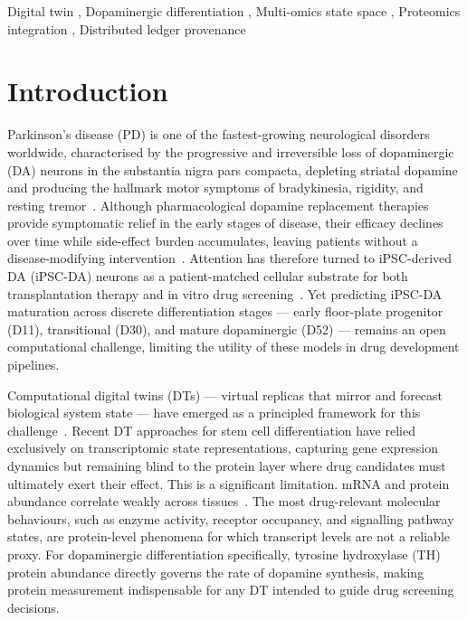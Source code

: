 \documentclass[5p,times,twocolumn]{elsarticle}
\newcommand{\rtag}[1]{}
\newcommand{\rev}[2]{\rtag{#1}#2}
\newcommand{\lang}[1]{#1}
\begin{document}
\begin{frontmatter}
  \begin{keyword}
    Digital twin \sep
    Dopaminergic differentiation \sep
    Multi-omics state space \sep
    Proteomics integration \sep
    Distributed ledger provenance
  \end{keyword}

\end{frontmatter}

\section{Introduction}

Parkinson's disease (PD) is one of the fastest-growing
neurological disorders worldwide, characterised by the
progressive and irreversible loss of dopaminergic (DA)
neurons in the substantia nigra pars compacta,
depleting striatal dopamine and producing the hallmark
motor symptoms of bradykinesia, rigidity, and resting
tremor~\cite{jang2020current}.
Although pharmacological dopamine replacement therapies
provide symptomatic relief in the early stages of
disease, their efficacy declines over time while
side-effect burden accumulates, leaving patients without
a disease-modifying intervention~\cite{barker2024history}.
\lang{Attention has therefore turned to}
iPSC-derived DA (iPSC-DA) neurons as a patient-matched
cellular substrate for both transplantation therapy
and in vitro drug screening~\cite{oz2023neural}.
Yet \lang{predicting} iPSC-DA maturation
across discrete differentiation stages\rev{AC}{ ---
  early floor-plate progenitor (D11), transitional (D30),
  and mature dopaminergic (D52) ---} remains an open computational challenge,
limiting the utility of these models in drug
development pipelines.

Computational digital twins (DTs) --- virtual replicas
that mirror and forecast biological system state ---
have emerged as a principled framework for this
challenge~\cite{masison2021modular}.
Recent DT approaches for stem cell differentiation
have relied exclusively on \lang{transcriptomic state
  representations}, capturing gene expression dynamics
but remaining blind to the protein layer where \lang{drug
  candidates} must ultimately exert their effect.
This is a significant limitation. mRNA and protein abundance correlate weakly across tissues~\cite{kosti2016cross}. The most drug-relevant molecular behaviours, such as enzyme activity, receptor occupancy, and signalling pathway states, are protein-level phenomena \lang{for which transcript levels are not a reliable proxy}.
For dopaminergic differentiation specifically,
tyrosine hydroxylase (TH) protein abundance directly
governs the rate of dopamine synthesis, making protein
measurement indispensable for any DT intended to
guide drug screening decisions.
\end{document}
